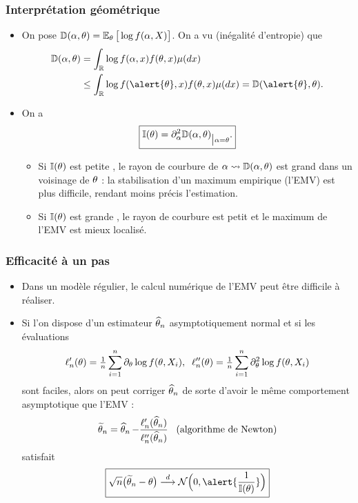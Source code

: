 \begin{frame}
\frametitle{Interprétation géométrique}
\begin{itemize}
\item On pose $\mathbb{D}(\alpha,\theta)=\operatorname{{\mathbb E}}_\theta\big[\log f(\alpha,X)\big]$. On a vu (inégalité d'entropie) que
\begin{align*}
\mathbb{D}(\curtheta,\truetheta) & = \int_{\R}\log f(\curtheta,x) f(\truetheta,x)\mu(dx) \\
&  \leq \int_{\R}\log f(\alert{\truetheta}, x) f(\truetheta,x)\mu(dx) = \mathbb{D}(\alert{\truetheta},\truetheta).
\end{align*}
\item On a
$$\boxed{\mathbb{I}(\theta)=\partial_\alpha^2 \mathbb{D}(\alpha,\theta)_{\big|\alpha=\theta}.
}$$
\begin{itemize}
\item Si $\mathbb{I}(\theta)$ est  petite , le \alert{rayon de courbure de $\alpha \leadsto \mathbb{D}(\alpha,\theta)$ est grand} dans un voisinage de $\theta$ : la stabilisation d'un maximum empirique (l'EMV) est plus difficile, rendant moins précis l'estimation.
\item Si $\mathbb{I}(\theta)$ est  grande , le \alert{ rayon de courbure est petit} et le maximum de l'EMV est mieux localisé.
 \end{itemize}
\end{itemize}
\end{frame}



\begin{frame}
\frametitle{Efficacité à un pas}
\begin{itemize}
\item Dans un modèle régulier, le \alert{calcul numérique} de l'EMV peut être difficile à réaliser.
\item Si l'on dispose d'un estimateur $\operatorname{\widehat \theta_{\mathnormal{n}}}$ \alert{asymptotiquement normal} et si les évaluations
$$\ell'_n(\theta) = \tfrac{1}{n}\sum_{i = 1}^n \partial_\theta \log f(\theta, X_i),\;\;\ell''_n(\theta)=\tfrac{1}{n}\sum_{i = 1}^n\partial_\theta^2 \log f(\theta, X_i)$$
sont \alert{faciles}, alors on peut \alert{ corriger} $\operatorname{\widehat \theta_{\mathnormal{n}}}$ de sorte d'avoir le même comportement asymptotique que l'EMV :
$$\widetilde {\theta}_n = \operatorname{\widehat \theta_{\mathnormal{n}}} - \frac{\ell'_n(\operatorname{\widehat \theta_{\mathnormal{n}}})}{\ell''_n(\operatorname{\widehat \theta_{\mathnormal{n}}})}\;\;\;\text{(algorithme de Newton)}$$
satisfait
$$\boxed{\sqrt{n}\big(\widetilde \truetheta_n-\truetheta\big) \stackrel{d}{\longrightarrow} {\mathcal N}\Big(0, \alert{\frac{1}{\mathbb{I}(\truetheta)}}\Big)}$$
\end{itemize}
\end{frame}
















